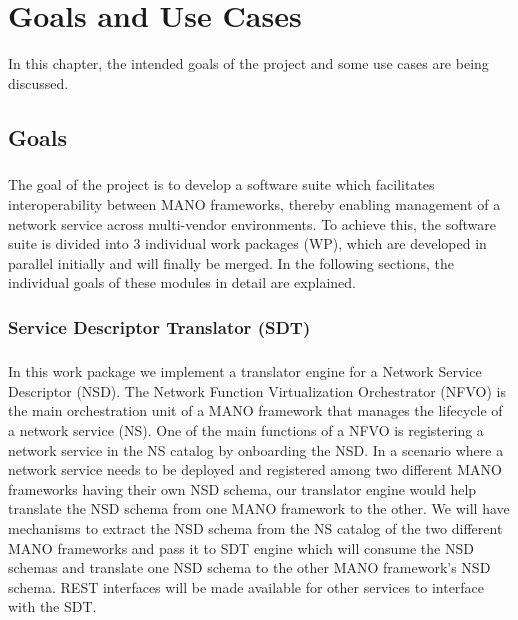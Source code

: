 \chapter{Goals and Use Cases}
\label{ch:Goals and Use Cases}

In this chapter, the intended goals of the project and some use cases are being discussed.

\section{Goals}

\paragraph{}
The goal of the project is to develop a software suite which facilitates interoperability between MANO frameworks, thereby enabling management of a network service across multi-vendor environments. To achieve this, the software suite is divided into 3 individual work packages (WP), which are developed in parallel initially and will finally be merged. In the following sections, the individual goals of these modules in detail are explained.

\subsection{Service Descriptor Translator (SDT)}
\paragraph{}

In this work package we implement a translator engine for a Network Service Descriptor (NSD). The Network Function Virtualization Orchestrator (NFVO) is the main orchestration unit of a MANO framework that manages the lifecycle of a network service (NS). One of the main functions of a NFVO is registering a network service in the NS catalog by onboarding the NSD. In a scenario where a network service needs to be deployed and registered among two different MANO
frameworks having their own NSD schema, our translator engine would help translate the NSD schema from one MANO framework to the other.
We will have mechanisms to extract the NSD schema from the NS catalog of the two different MANO frameworks and pass it to SDT engine which will consume the NSD schemas and translate one NSD schema to the other MANO framework's NSD schema. REST interfaces will be made available for other services to interface with the SDT.

